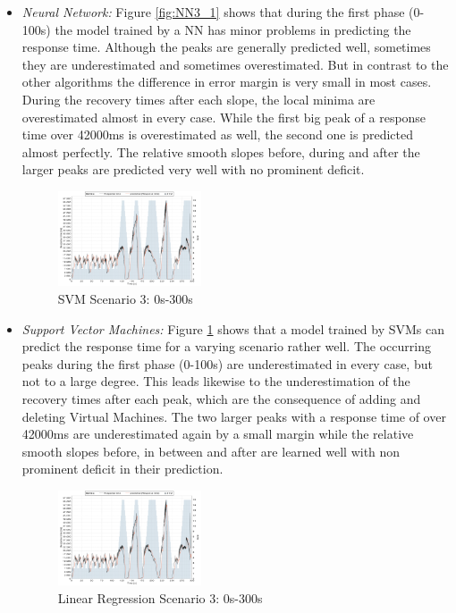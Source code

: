 \begin{itemize}
\item \textit{Neural Network:} Figure \ref{fig:NN3_1} shows that during the first phase (0-100s) the model trained by a NN has minor problems in predicting the response time. Although the peaks are generally predicted well, sometimes they are underestimated and sometimes overestimated. But in contrast to the other algorithms the difference in error margin is very small in most cases. During the recovery times after each slope, the local minima are overestimated almost in every case. While the first big peak of a response time over 42000ms is overestimated as well, the second one is predicted almost perfectly. The relative smooth slopes before, during and after the larger peaks are predicted very well with no prominent deficit. 

\begin{figure}[ht]
	\begin{center}
		\includegraphics[width=0.40\textwidth]{chapters/chapter5/fig/SVM3}
	\end{center}
	\caption{SVM Scenario 3: 0s-300s}
	\label{fig:SVM3_1}
\end{figure}

\item \textit{Support Vector Machines:} Figure \ref{fig:SVM3_1} shows that a model trained by SVMs can predict the response time for a varying scenario rather well. The occurring peaks during the first phase (0-100s) are underestimated in every case, but not to a large degree. This leads likewise to the underestimation of the recovery times after each peak, which are the consequence of adding and deleting Virtual Machines. The two larger peaks with a response time of over 42000ms are underestimated again by a small margin while the relative smooth slopes before, in between and after are learned well with non prominent deficit in their prediction. 

\begin{figure}[ht]
	\begin{center}
		\includegraphics[width=0.40\textwidth]{chapters/chapter5/fig/LR3}
	\end{center}
	\caption{Linear Regression Scenario 3: 0s-300s}
	\label{fig:LR3_1}
\end{figure}


\end{itemize}
